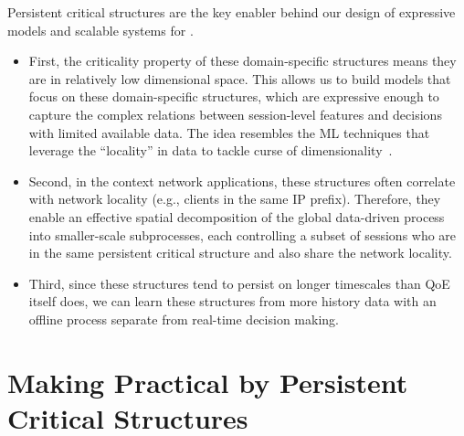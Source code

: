 Persistent critical structures are the key enabler behind our design of 
expressive models and scalable systems for \ddn.
\begin{itemize}

\item First, the criticality property of these domain-specific structures 
means they are in relatively low dimensional space.
This allows us to build models that focus on these  domain-specific structures, 
which are expressive enough to capture the complex relations between 
session-level features and decisions with limited available data.
The idea resembles the ML techniques that leverage the ``locality'' in 
data to tackle curse of dimensionality~\cite{ml101}.

\item Second, in the context network applications,
these structures often correlate with network locality (e.g., clients 
in the same IP prefix). Therefore, they enable an effective spatial 
decomposition of the global data-driven process into smaller-scale 
subprocesses, each controlling a subset of sessions who are in the same
persistent critical structure and also share the network locality.

\item Third, since these structures tend to persist on longer timescales than 
QoE itself does, we can learn these structures from more history data 
with an
offline process separate from real-time 
decision making.

\end{itemize}


\section{Making \ddn Practical by Persistent Critical Structures}
\label{sec:overview:solutions}


